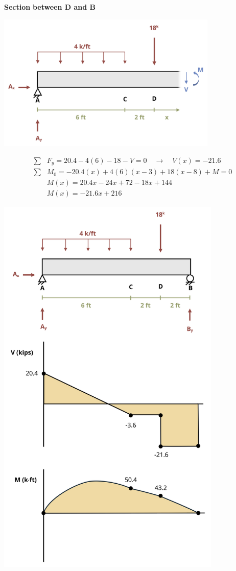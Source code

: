 \documentclass[
  letterpaper,
  DIV=11,
  numbers=noendperiod]{scrreprt}
\begin{document}
\begin{tcolorbox}
\begin{tcolorbox}
\textbf{Section} \textbf{between D and B}

\begin{center}
\includegraphics[width=4.14583in,height=\textheight]{images/CH7 PNGs/example 7.2 part 8.png}
\end{center}

\[
\begin{aligned}
\sum &F_y = 20.4-4(6)-18-V=0 \quad\rightarrow\quad V(x) =-21.6 \\
\sum &M_0 =-20.4(x)+4(6)(x-3)+18(x-8)+M=0 \\
& M(x) =20.4 x-24 x+72-18 x+144 \\
&M(x) =-21.6 x+216
\end{aligned}
\]

\begin{center}
\includegraphics[width=4.21875in,height=\textheight]{images/CH7 PNGs/example 7.2 part 9.png}
\end{center}


\end{tcolorbox}
\end{tcolorbox}
\end{document}

